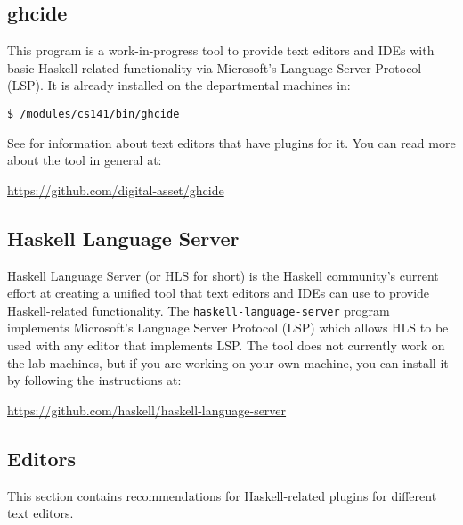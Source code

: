 \subsection{ghcide}

This program is a work-in-progress tool to provide text editors and IDEs with basic Haskell-related functionality via Microsoft's Language Server Protocol (LSP). It is already installed on the departmental machines in:
\begin{verbatim}
$ /modules/cs141/bin/ghcide
\end{verbatim}
See  for information about text editors that have plugins for it. You can read more about the tool in general at:
\begin{center}\small
	\url{https://github.com/digital-asset/ghcide}
\end{center}

\subsection{Haskell Language Server}

Haskell Language Server (or HLS for short) is the Haskell community's current effort at creating a unified tool that text editors and IDEs can use to provide Haskell-related functionality. The \texttt{\small haskell-language-server} program implements Microsoft's Language Server Protocol (LSP) which allows HLS to be used with any editor that implements LSP. The tool does not currently work on the lab machines, but if you are working on your own machine, you can install it by following the instructions at:
\begin{center}\small
	\url{https://github.com/haskell/haskell-language-server}
\end{center}

\subsection{Editors}
\label{sec:editors}

This section contains recommendations for Haskell-related plugins for different text editors.

